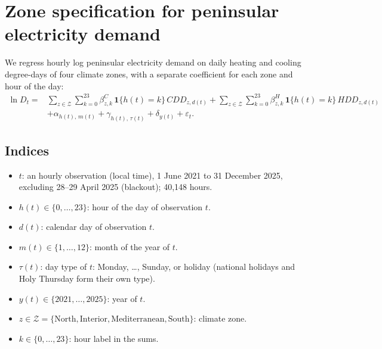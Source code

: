\documentclass[11pt]{article}
\begin{document}
\section*{Zone specification for peninsular electricity demand}

We regress hourly log peninsular electricity demand on daily heating and
cooling degree-days of four climate zones, with a separate coefficient for
each zone and hour of the day:
\begin{equation}
\begin{split}
\ln D_t = {} & \sum_{z \in \mathcal{Z}} \sum_{k=0}^{23}
  \beta^{C}_{z,k}\, \mathbf{1}\{h(t)=k\}\, CDD_{z,d(t)}
  + \sum_{z \in \mathcal{Z}} \sum_{k=0}^{23}
  \beta^{H}_{z,k}\, \mathbf{1}\{h(t)=k\}\, HDD_{z,d(t)} \\
  & + \alpha_{h(t),\,m(t)} + \gamma_{h(t),\,\tau(t)} + \delta_{y(t)} + \varepsilon_t .
\end{split}
\label{eq:zone}
\end{equation}

\subsection*{Indices}
\begin{itemize}
  \item $t$: an hourly observation (local time), 1 June 2021 to 31 December 2025,
        excluding 28--29 April 2025 (blackout); 40{,}148 hours.
  \item $h(t) \in \{0,\dots,23\}$: hour of the day of observation $t$.
  \item $d(t)$: calendar day of observation $t$.
  \item $m(t) \in \{1,\dots,12\}$: month of the year of $t$.
  \item $\tau(t)$: day type of $t$: Monday, \dots, Sunday, or holiday (national
        holidays and Holy Thursday form their own type).
  \item $y(t) \in \{2021,\dots,2025\}$: year of $t$.
  \item $z \in \mathcal{Z} = \{\text{North}, \text{Interior}, \text{Mediterranean}, \text{South}\}$: climate zone.
  \item $k \in \{0,\dots,23\}$: hour label in the sums.
\end{itemize}
\end{document}
